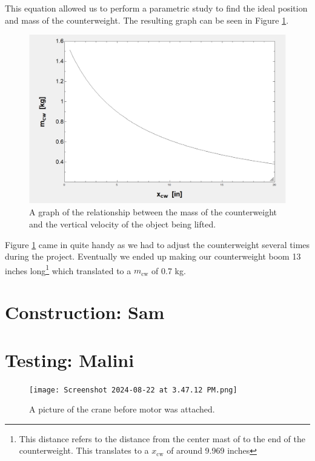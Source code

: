 \documentclass[letterpaper, 12pt]{article}
\begin{document}
This equation allowed us to perform a parametric study to find the ideal position and mass of the counterweight. The resulting graph can be seen in Figure \ref{fig:Counter Weight.png}.
\begin{figure}[H]
    \centering
    \includegraphics[width =.55\linewidth]{Counter Weight.png}
    \caption{A graph of the relationship between the mass of the counterweight and the vertical velocity of the object being lifted.}
    \label{fig:Counter Weight.png}
\end{figure}

Figure \ref{fig:Counter Weight.png} came in quite handy as we had to adjust the counterweight several times during the project.
Eventually we ended up making our counterweight boom 13 inches long\footnote{This distance refers to the distance from the center mast of to the end of the counterweight. This translates to a $x_{\text{cw}}$ of around 9.969 inches} which translated to a $m_{\text{cw}}$ of 0.7 kg.

\section{Construction: Sam }
\section{Testing: Malini}
\begin{figure}[H]
    \centering
    \texttt{[image: Screenshot 2024-08-22 at 3.47.12 PM.png]}
    \caption{A picture of the crane before motor was attached.}
    \label{fig:pic of Crane}
\end{figure}
\end{document}
